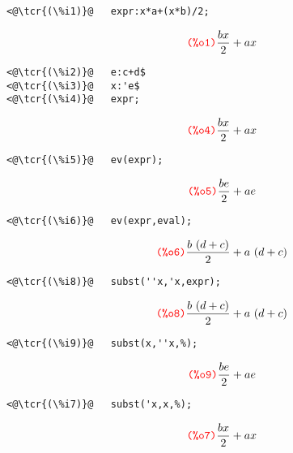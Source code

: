\documentclass[../Maxima_Workbook.tex]{subfiles}
\begin{document}
\lz \begin{small}
\color{blue} \leqn
\begin{lstlisting}
<@\tcr{(\%i1)}@   expr:x*a+(x*b)/2;
\end{lstlisting}
\vspace{-5mm} \[\tag*{\tcr{\ttfamily (\%o1)}} \frac{b x}{2}+a x \]
\vspace{-6mm} \begin{lstlisting}
<@\tcr{(\%i2)}@   e:c+d$
<@\tcr{(\%i3)}@   x:'e$
<@\tcr{(\%i4)}@   expr;
\end{lstlisting}
\vspace{-5mm} \[\tag*{\tcr{\ttfamily (\%o4)}} \frac{b x}{2}+a x \]
\vspace{-6mm} \begin{lstlisting}
<@\tcr{(\%i5)}@   ev(expr);
\end{lstlisting}
\vspace{-5mm} \[\tag*{\tcr{\ttfamily (\%o5)}} \frac{b e}{2}+a e \]
\vspace{-6mm} \begin{lstlisting}
<@\tcr{(\%i6)}@   ev(expr,eval);
\end{lstlisting}
\vspace{-5mm} \[\tag*{\tcr{\ttfamily (\%o6)}} \frac{b\, \left( d+c\right) }{2}+a\, \left( d+c\right) \]
\vspace{-6mm} \begin{lstlisting}
<@\tcr{(\%i8)}@   subst(''x,'x,expr);
\end{lstlisting}
\vspace{-5mm} \[\tag*{\tcr{\ttfamily (\%o8)}} \frac{b\, \left( d+c\right) }{2}+a\, \left( d+c\right) \]
\vspace{-6mm} \begin{lstlisting}
<@\tcr{(\%i9)}@   subst(x,''x,%);
\end{lstlisting}
\vspace{-5mm} \[\tag*{\tcr{\ttfamily (\%o9)}} \frac{b e}{2}+a e \]
\vspace{-6mm} \begin{lstlisting}
<@\tcr{(\%i7)}@   subst('x,x,%);
\end{lstlisting}
\vspace{-5mm} \[\tag*{\tcr{\ttfamily (\%o7)}} \frac{b x}{2}+a x \]
\color{black} \reqn
\end{small} \vspace{-4mm}

\lzz {} \hfill \tcr{[function]}
\end{document}
